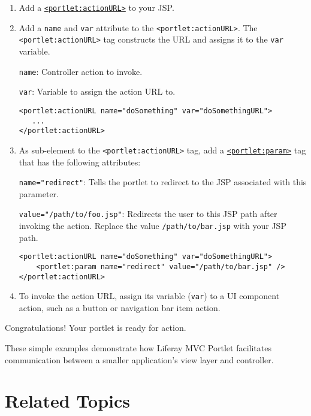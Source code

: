 \begin{enumerate}
\def\labelenumi{\arabic{enumi}.}
\item
  Add a
  \href{https://docs.liferay.com/dxp/portal/7.2-latest/taglibs/util-taglib/portlet/actionURL.html}{\texttt{\textless{}portlet:actionURL\textgreater{}}}
  to your JSP.
\item
  Add a \texttt{name} and \texttt{var} attribute to the
  \texttt{\textless{}portlet:actionURL\textgreater{}}. The
  \texttt{\textless{}portlet:actionURL\textgreater{}} tag constructs the
  URL and assigns it to the \texttt{var} variable.

  \texttt{name}: Controller action to invoke.

  \texttt{var}: Variable to assign the action URL to.

\begin{verbatim}
<portlet:actionURL name="doSomething" var="doSomethingURL">
   ...
</portlet:actionURL>
\end{verbatim}
\item
  As sub-element to the
  \texttt{\textless{}portlet:actionURL\textgreater{}} tag, add a
  \href{https://docs.liferay.com/dxp/portal/7.2-latest/taglibs/util-taglib/portlet/param.html}{\texttt{\textless{}portlet:param\textgreater{}}}
  tag that has the following attributes:

  \texttt{name="redirect"}: Tells the portlet to redirect to the JSP
  associated with this parameter.

  \texttt{value="/path/to/foo.jsp"}: Redirects the user to this JSP path
  after invoking the action. Replace the value \texttt{/path/to/bar.jsp}
  with your JSP path.

\begin{verbatim}
<portlet:actionURL name="doSomething" var="doSomethingURL">
    <portlet:param name="redirect" value="/path/to/bar.jsp" />
</portlet:actionURL>
\end{verbatim}
\item
  To invoke the action URL, assign its variable (\texttt{var}) to a UI
  component action, such as a button or navigation bar item action.
\end{enumerate}

Congratulations! Your portlet is ready for action.

These simple examples demonstrate how Liferay MVC Portlet facilitates
communication between a smaller application's view layer and controller.

\section{Related Topics}\label{related-topics-5}


